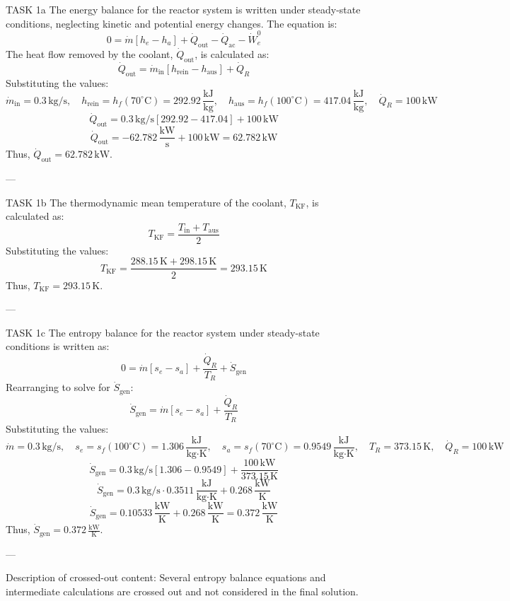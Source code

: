 TASK 1a  
The energy balance for the reactor system is written under steady-state conditions, neglecting kinetic and potential energy changes. The equation is:  
\[
0 = \dot{m} \left[ h_e - h_a \right] + \dot{Q}_{\text{out}} - \dot{Q}_{\text{ac}} - \dot{W}_e^0
\]  
The heat flow removed by the coolant, \( \dot{Q}_{\text{out}} \), is calculated as:  
\[
\dot{Q}_{\text{out}} = \dot{m}_{\text{in}} \left[ h_{\text{rein}} - h_{\text{aus}} \right] + \dot{Q}_R
\]  
Substituting the values:  
\[
\dot{m}_{\text{in}} = 0.3 \, \text{kg/s}, \quad h_{\text{rein}} = h_f(70^\circ\text{C}) = 292.92 \, \frac{\text{kJ}}{\text{kg}}, \quad h_{\text{aus}} = h_f(100^\circ\text{C}) = 417.04 \, \frac{\text{kJ}}{\text{kg}}, \quad \dot{Q}_R = 100 \, \text{kW}
\]  
\[
\dot{Q}_{\text{out}} = 0.3 \, \text{kg/s} \left[ 292.92 - 417.04 \right] + 100 \, \text{kW}
\]  
\[
\dot{Q}_{\text{out}} = -62.782 \, \frac{\text{kW}}{\text{s}} + 100 \, \text{kW} = 62.782 \, \text{kW}
\]  
Thus, \( \dot{Q}_{\text{out}} = 62.782 \, \text{kW} \).

---

TASK 1b  
The thermodynamic mean temperature of the coolant, \( T_{\text{KF}} \), is calculated as:  
\[
T_{\text{KF}} = \frac{T_{\text{in}} + T_{\text{aus}}}{2}
\]  
Substituting the values:  
\[
T_{\text{KF}} = \frac{288.15 \, \text{K} + 298.15 \, \text{K}}{2} = 293.15 \, \text{K}
\]  
Thus, \( T_{\text{KF}} = 293.15 \, \text{K} \).

---

TASK 1c  
The entropy balance for the reactor system under steady-state conditions is written as:  
\[
0 = \dot{m} \left[ s_e - s_a \right] + \frac{\dot{Q}_R}{T_R} + \dot{S}_{\text{gen}}
\]  
Rearranging to solve for \( \dot{S}_{\text{gen}} \):  
\[
\dot{S}_{\text{gen}} = \dot{m} \left[ s_e - s_a \right] + \frac{\dot{Q}_R}{T_R}
\]  
Substituting the values:  
\[
\dot{m} = 0.3 \, \text{kg/s}, \quad s_e = s_f(100^\circ\text{C}) = 1.306 \, \frac{\text{kJ}}{\text{kg·K}}, \quad s_a = s_f(70^\circ\text{C}) = 0.9549 \, \frac{\text{kJ}}{\text{kg·K}}, \quad T_R = 373.15 \, \text{K}, \quad \dot{Q}_R = 100 \, \text{kW}
\]  
\[
\dot{S}_{\text{gen}} = 0.3 \, \text{kg/s} \left[ 1.306 - 0.9549 \right] + \frac{100 \, \text{kW}}{373.15 \, \text{K}}
\]  
\[
\dot{S}_{\text{gen}} = 0.3 \, \text{kg/s} \cdot 0.3511 \, \frac{\text{kJ}}{\text{kg·K}} + 0.268 \, \frac{\text{kW}}{\text{K}}
\]  
\[
\dot{S}_{\text{gen}} = 0.10533 \, \frac{\text{kW}}{\text{K}} + 0.268 \, \frac{\text{kW}}{\text{K}} = 0.372 \, \frac{\text{kW}}{\text{K}}
\]  
Thus, \( \dot{S}_{\text{gen}} = 0.372 \, \frac{\text{kW}}{\text{K}} \).  

---

Description of crossed-out content: Several entropy balance equations and intermediate calculations are crossed out and not considered in the final solution.